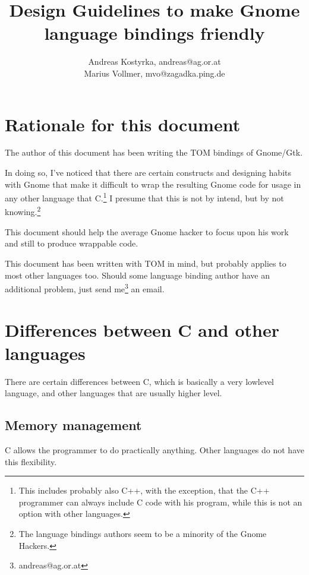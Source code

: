 \documentclass{article}
\begin{document}
\title{Design Guidelines to make Gnome language bindings friendly}
\author{Andreas Kostyrka, andreas@ag.or.at\\
        Marius Vollmer, mvo@zagadka.ping.de}
\maketitle
\tableofcontents
\section{Rationale for this document}
The author of this document has been writing the TOM bindings of
Gnome/Gtk.

In doing so, I've noticed that there are certain constructs and
designing habits with Gnome that make it difficult to wrap the
resulting Gnome code for usage in any other language that
C.\footnote{This includes probably also C++, with the exception, that
the C++ programmer can always include C code with his program, while
this is not an option with other languages.}
I presume that this is not by intend, but by not knowing.\footnote{The
language bindings authors seem to be a minority of the Gnome Hackers.}

This document should help the average Gnome hacker to focus upon his
work and still to produce wrappable code.

This document has been written with TOM in mind, but probably applies
to most other languages too. Should some language binding author have
an additional problem, just send me\footnote{andreas@ag.or.at} an
email.

\section{Differences between C and other languages}

There are certain differences between C, which is basically a very
lowlevel language, and other languages that are usually higher level.

\subsection{Memory management}

C allows the programmer to do practically anything. Other languages do
not have this flexibility.
\end{document}

